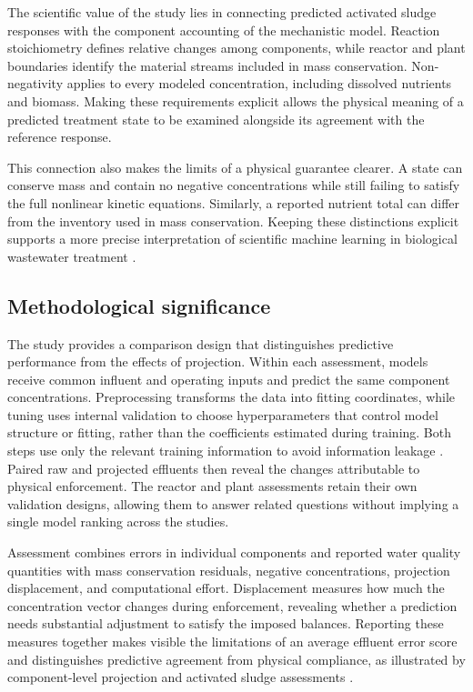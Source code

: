 The scientific value of the study lies in connecting predicted activated sludge responses with the component accounting of the mechanistic model. Reaction stoichiometry defines relative changes among components, while reactor and plant boundaries identify the material streams included in mass conservation. Non-negativity applies to every modeled concentration, including dissolved nutrients and biomass. Making these requirements explicit allows the physical meaning of a predicted treatment state to be examined alongside its agreement with the reference response.

This connection also makes the limits of a physical guarantee clearer. A state can conserve mass and contain no negative concentrations while still failing to satisfy the full nonlinear kinetic equations. Similarly, a reported nutrient total can differ from the inventory used in mass conservation. Keeping these distinctions explicit supports a more precise interpretation of scientific machine learning in biological wastewater treatment \citep{Henze2006,TakacsVanrolleghem2006}.

\subsection{Methodological significance}

The study provides a comparison design that distinguishes predictive performance from the effects of projection. Within each assessment, models receive common influent and operating inputs and predict the same component concentrations. Preprocessing transforms the data into fitting coordinates, while tuning uses internal validation to choose hyperparameters that control model structure or fitting, rather than the coefficients estimated during training. Both steps use only the relevant training information to avoid information leakage \citep{Kaufman2012}. Paired raw and projected effluents then reveal the changes attributable to physical enforcement. The reactor and plant assessments retain their own validation designs, allowing them to answer related questions without implying a single model ranking across the studies.

Assessment combines errors in individual components and reported water quality quantities with mass conservation residuals, negative concentrations, projection displacement, and computational effort. Displacement measures how much the concentration vector changes during enforcement, revealing whether a prediction needs substantial adjustment to satisfy the imposed balances. Reporting these measures together makes visible the limitations of an average effluent error score and distinguishes predictive agreement from physical compliance, as illustrated by component-level projection and activated sludge assessments \citep{SturmSilva2024,Selerio2026}.

